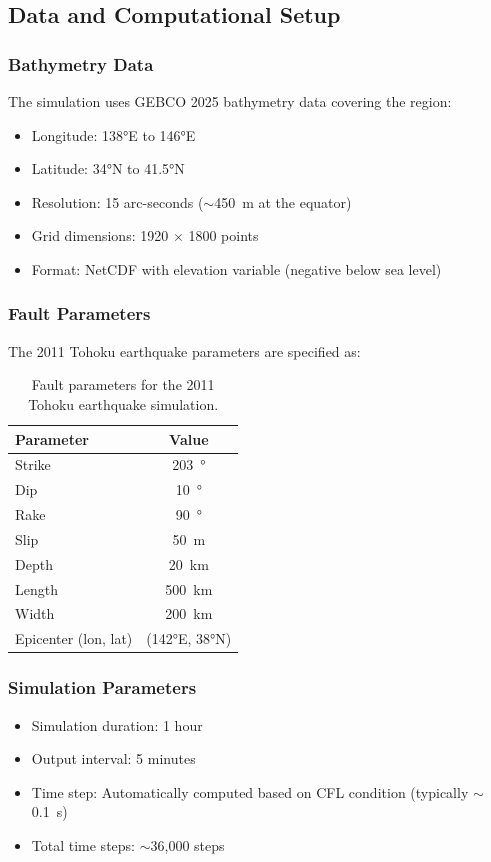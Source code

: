 \documentclass[12pt]{article}
\begin{document}
\subsection{Data and Computational Setup}

\subsubsection{Bathymetry Data}
The simulation uses GEBCO 2025 bathymetry data covering the region:
\begin{itemize}
    \item Longitude: 138°E to 146°E
    \item Latitude: 34°N to 41.5°N
    \item Resolution: 15 arc-seconds ($\sim$\SI{450}{\meter} at the equator)
    \item Grid dimensions: 1920 $\times$ 1800 points
    \item Format: NetCDF with elevation variable (negative below sea level)
\end{itemize}

\subsubsection{Fault Parameters}
The 2011 Tohoku earthquake parameters are specified as:
\begin{table}[H]
\centering
\begin{tabular}{lc}
\toprule
Parameter & Value \\
\midrule
Strike & \SI{203}{\degree} \\
Dip & \SI{10}{\degree} \\
Rake & \SI{90}{\degree} \\
Slip & \SI{50}{\meter} \\
Depth & \SI{20}{\kilo\meter} \\
Length & \SI{500}{\kilo\meter} \\
Width & \SI{200}{\kilo\meter} \\
Epicenter (lon, lat) & (142°E, 38°N) \\
\bottomrule
\end{tabular}
\caption{Fault parameters for the 2011 Tohoku earthquake simulation.}
\label{tab:fault_params}
\end{table}

\subsubsection{Simulation Parameters}
\begin{itemize}
    \item Simulation duration: 1 hour
    \item Output interval: 5 minutes
    \item Time step: Automatically computed based on CFL condition (typically $\sim$\SI{0.1}{\second})
    \item Total time steps: $\sim$36,000 steps
\end{itemize}
\end{document}
